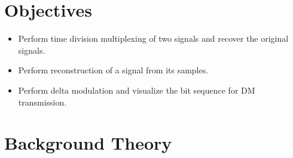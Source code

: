 \documentclass{lab_sheet}
\begin{document}
    \tableofcontents
    \clearpage
    \listoffigures
    \clearpage
    \lstlistoflistings
    \clearpage
    
\section{Objectives}
\begin{itemize}
    \item Perform time division multiplexing of two signals and recover the original signals.
    \item Perform reconstruction of a signal from its samples.
    \item Perform delta modulation and visualize the bit sequence for DM transmission.
\end{itemize}

\section{Background Theory}
\end{document}
